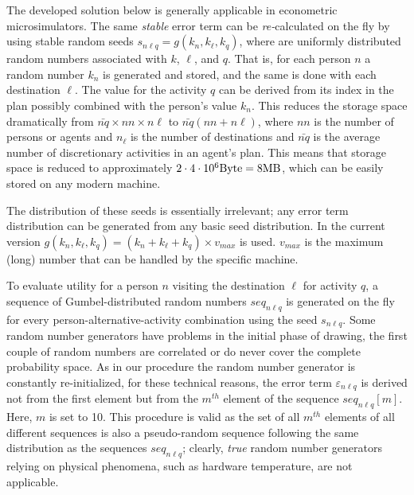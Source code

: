 The developed solution below is generally applicable in econometric microsimulators. The same \emph{stable} error term can be \emph{re-}calculated on the fly by using stable random seeds $s_{n\ell q} = g(k_n, k_\ell, k_q)$, where are uniformly distributed random numbers associated with $k$, $\ell$, and $q$. 
That is, for each person $n$ a random number $k_n$ is generated and stored, and the same is done with each destination $\ell$. 
The value for the activity $q$ can be derived from its index in the plan possibly combined with the person's value $k_n$. 
This reduces the storage space dramatically from $\bar{nq} \times nn \times n\ell$ to $\bar{nq}(nn + n\ell)$, where $nn$ is the number of persons or agents and $n_\ell$ is the number of destinations and $\bar{nq}$ is the average number of discretionary activities in an agent's plan.   
This means that storage space is reduced to approximately $2 \cdot 4 \cdot 10^{6} \hbox{Byte} = 8 \hbox{MB}$, which can be easily stored 
on any modern machine.

The distribution of these seeds is essentially irrelevant; any error term distribution can be generated from any basic seed distribution. 
In the current version $g(k_n, k_\ell, k_q) = (k_n + k_\ell + k_q) \times v_{max}$ is used. $v_{max}$ is the maximum (long) number that can be handled by the specific machine.

To evaluate utility for a person $n$ visiting the destination $\ell$ for activity $q$, a sequence of Gumbel-distributed random numbers $seq_{n\ell q}$ is generated on the fly for every person-alternative-activity combination using the seed $s_{n\ell q}$. 
Some random number generators have problems in the initial phase of drawing, \eg the first couple of random numbers are correlated or do never cover the complete probability space. As in our procedure the random number generator is constantly re-initialized, for these technical reasons, the error term $\varepsilon_{n\ell q}$ is derived not from the first element but from the $m^{th}$ element of the sequence $seq_{n\ell q}[m]$. 
Here, $m$ is set to 10. 
This procedure is valid as the set of all  $m^{th}$ elements of all different sequences is also a pseudo-random sequence following the same distribution as the sequences $seq_{n\ell q}$; clearly, \emph{true} random number generators relying on physical phenomena, such as hardware temperature, are not applicable. 

